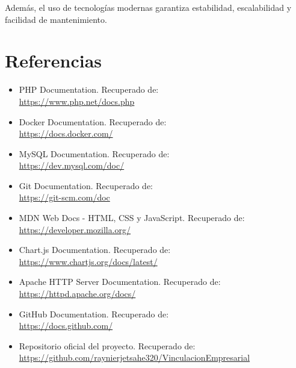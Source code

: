 \documentclass[12pt,letterpaper,oneside]{extreport}
\begin{document}
Además, el uso de tecnologías modernas garantiza estabilidad, escalabilidad y facilidad de mantenimiento.

\chapter{Referencias}

\begin{itemize}

    \item PHP Documentation. Recuperado de: \\
    \url{https://www.php.net/docs.php}

    \item Docker Documentation. Recuperado de: \\
    \url{https://docs.docker.com/}

    \item MySQL Documentation. Recuperado de: \\
    \url{https://dev.mysql.com/doc/}

    \item Git Documentation. Recuperado de: \\
    \url{https://git-scm.com/doc}

    \item MDN Web Docs - HTML, CSS y JavaScript. Recuperado de: \\
    \url{https://developer.mozilla.org/}

    \item Chart.js Documentation. Recuperado de: \\
    \url{https://www.chartjs.org/docs/latest/}

    \item Apache HTTP Server Documentation. Recuperado de: \\
    \url{https://httpd.apache.org/docs/}

    \item GitHub Documentation. Recuperado de: \\
    \url{https://docs.github.com/}

    \item Repositorio oficial del proyecto. Recuperado de: \\
    \url{https://github.com/raynierjetsahe320/VinculacionEmpresarial}

\end{itemize}
\end{document}
